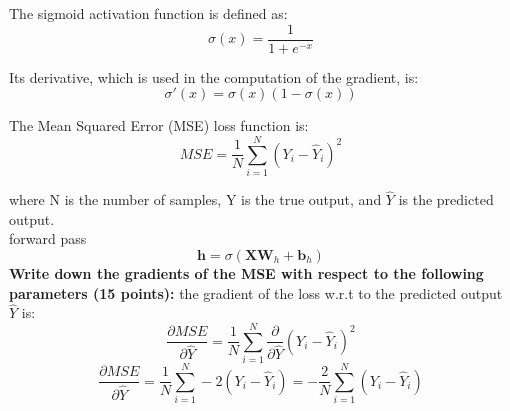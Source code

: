 \documentclass{article}
\begin{document}
The sigmoid activation function is defined as:
\[
\sigma(x) = \frac{1}{1 + e^{-x}}
\]

Its derivative, which is used in the computation of the gradient, is:
\[
\sigma'(x) = \sigma(x)(1 - \sigma(x))
\]

The Mean Squared Error (MSE) loss function is:
\[
MSE = \frac{1}{N} \sum_{i=1}^{N} (Y_i - \hat{Y}_i)^2
\]

where N is the number of samples, Y is the true output, and \(\hat{Y}\) is the predicted output.
\\ forward pass
\[
\mathbf{h} = \sigma(\mathbf{X} \mathbf{W}_h + \mathbf{b}_h)
\]
\textbf{Write down the gradients of the MSE with respect to the following parameters (15 points):}
the gradient of the loss w.r.t to the predicted output $\hat{Y}$ is:
\[
\frac{\partial MSE}{\partial \hat{Y}} = \frac{1}{N} \sum_{i=1}^{N} \frac{\partial}{\partial \hat{Y}} (Y_i - \hat{Y}_i)^2
\]
\[
\frac{\partial MSE}{\partial \hat{Y}} = \frac{1}{N} \sum_{i=1}^{N} -2(Y_i - \hat{Y}_i) = -\frac{2}{N} \sum_{i=1}^{N} (Y_i - \hat{Y}_i)
\]
\end{document}
